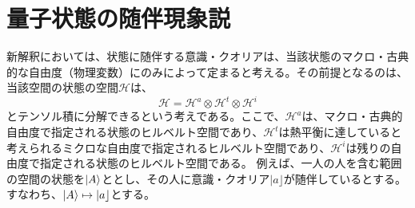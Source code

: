 \section{量子状態の随伴現象説}
新解釈においては、状態に随伴する意識・クオリアは、当該状態のマクロ・古典的な自由度（物理変数）にのみによって定まると考える。その前提となるのは、当該空間の状態の空間$\mathcal{H}$は、
\begin{equation}
    \mathcal{H} = \mathcal{H}^a \otimes  \mathcal{H}^t \otimes  \mathcal{H}^i
\end{equation}
とテンソル積に分解できるという考えである。ここで、$\mathcal{H}^a$は、マクロ・古典的自由度で指定される状態のヒルベルト空間であり、$\mathcal{H}^t$は熱平衡に達していると考えられるミクロな自由度で指定されるヒルベルト空間であり、$\mathcal{H}^i$は残りの自由度で指定される状態のヒルベルト空間である。
例えば、一人の人を含む範囲の空間の状態を$\ket{A}$ととし、その人に意識・クオリア$|a \rfloor$が随伴しているとする。すなわち、$\ket{A} \mapsto |a \rfloor$とする。